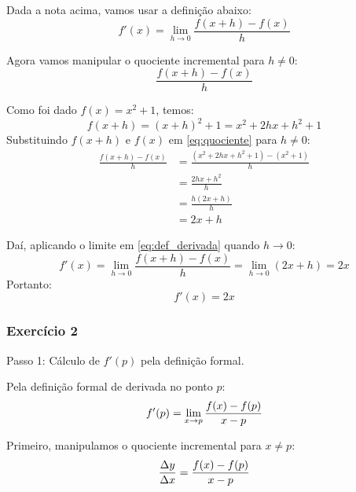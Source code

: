 \begin{enumerate}[label=\alph*)]
    Dada a nota acima, vamos usar a definição abaixo:
    \begin{equation}
        f'(x) = \lim_{h \to 0} \frac{f(x + h) - f(x)}{h} \label{eq:def_derivada}
    \end{equation}

    Agora vamos manipular o quociente incremental para $h \neq 0$:
    \begin{equation}
      \frac{f(x + h) - f(x)}{h} \label{eq:quociente}
    \end{equation}

    Como foi dado $f(x) = x^2 + 1$, temos:
    \[
    f(x + h) = (x + h)^2 + 1 = x^2 + 2hx + h^2 + 1
    \]
    Substituindo $f(x + h)$ e $f(x)$ em \eqref{eq:quociente} para $h \neq 0$:
    \begin{align*}
        \frac{f(x + h) - f(x)}{h} &= \frac{(x^2 + 2hx + h^2 + 1) - (x^2 + 1)}{h} \\[0.20cm]
        &= \frac{2hx + h^2}{h} \\[0.20cm]
        &= \frac{h(2x + h)}{h} \\[0.20cm]
        &= 2x + h
    \end{align*}

    Daí, aplicando o limite em \eqref{eq:def_derivada} quando $h \to 0$:
    \[
    f'(x) = \lim_{h \to 0} \frac{f(x + h) - f(x)}{h} = \lim_{h \to 0} (2x + h) = 2x
    \]
    Portanto:
    \[
    f'(x) = 2x
    \]
\end{enumerate}

\vspace{0.6cm}
\subsubsection*{Exercício 2}

Passo 1: Cálculo de $f'(p)$ pela definição formal.

Pela definição formal de derivada no ponto $p$:
\begin{equation}
    f'(p) = \lim_{x \to p} \frac{f(x) - f(p)}{x - p} \label{eq:def_derivada_ex2}
\end{equation}

Primeiro, manipulamos o quociente incremental para $x \neq p$:
\begin{equation}
    \frac{\Delta y}{\Delta x} = \frac{f(x) - f(p)}{x - p}  \label{eq:quociente_ex2}
\end{equation}

